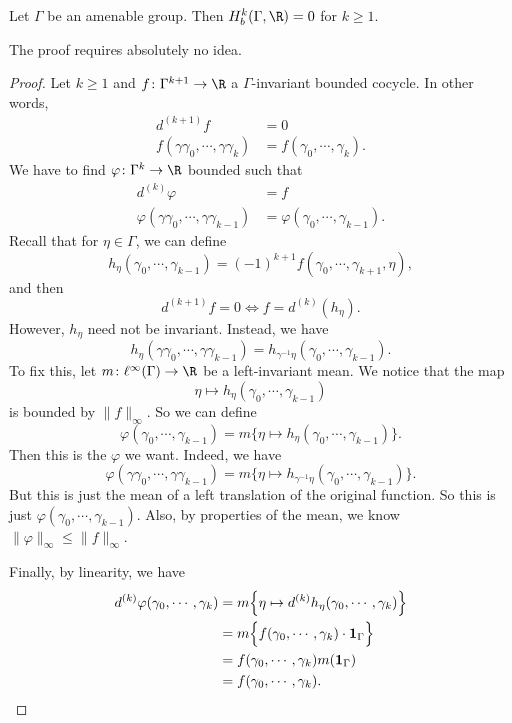\documentclass[a4paper]{article}
\begin{document}
\begin{prop}
  Let $\Gamma$ be an amenable group. Then $H^k_b(\Gamma, \R) = 0$ for $k \geq 1$.
\end{prop}

The proof requires absolutely no idea.
\begin{proof}
  Let $k \geq 1$ and $f\colon \Gamma^{k + 1} \to \R$ a $\Gamma$-invariant bounded cocycle. In other words,
  \begin{align*}
    d^{(k + 1)} f &= 0\\
    f(\gamma\gamma_0, \cdots, \gamma\gamma_k) &= f(\gamma_0, \cdots, \gamma_k).
  \end{align*}
  We have to find $\varphi\colon \Gamma^k \to \R$ bounded such that
  \begin{align*}
    d^{(k)} \varphi &= f\\
    \varphi(\gamma\gamma_0, \cdots, \gamma\gamma_{k - 1}) &= \varphi(\gamma_0, \cdots, \gamma_{k - 1}).
  \end{align*}
  Recall that for $\eta \in \Gamma$, we can define
  \[
    h_\eta (\gamma_0, \cdots, \gamma_{k - 1}) = (-1)^{k + 1} f(\gamma_0, \cdots, \gamma_{k + 1}, \eta),
  \]
  and then
  \[
    d^{(k + 1)}f = 0 \Longleftrightarrow f = d^{(k)}(h_\eta).
  \]
  However, $h_\eta$ need not be invariant. Instead, we have
  \[
    h_\eta(\gamma\gamma_0, \cdots, \gamma\gamma_{k - 1}) = h_{\gamma^{-1} \eta} (\gamma_0, \cdots, \gamma_{k - 1}).
  \]
  To fix this, let $m \colon \ell^\infty(\Gamma) \to \R$ be a left-invariant mean. We notice that the map
  \[
    \eta \mapsto h_\eta (\gamma_0, \cdots, \gamma_{k - 1})
  \]
  is bounded by $\|f\|_\infty$. So we can define
  \[
    \varphi(\gamma_0, \cdots, \gamma_{k - 1}) = m \Big\{ \eta \mapsto h_\eta (\gamma_0, \cdots, \gamma_{k - 1})\Big\}.
  \]
  Then this is the $\varphi$ we want. Indeed, we have
  \[
    \varphi(\gamma \gamma_0, \cdots, \gamma \gamma_{k - 1}) = m \Big\{ \eta \mapsto h_{\gamma^{-1}\eta} (\gamma_0, \cdots, \gamma_{k - 1})\Big\}.
  \]
  But this is just the mean of a left translation of the original function. So this is just $\varphi(\gamma_0, \cdots, \gamma_{k - 1})$. Also, by properties of the mean, we know $\|\varphi\|_\infty \leq \|f\|_\infty$.

  Finally, by linearity, we have
  \begin{align*}
    d^{(k)} \varphi(\gamma_0, \cdots, \gamma_k) &= m \Big\{ \eta \mapsto d^{(k)} h_\eta (\gamma_0, \cdots, \gamma_k) \Big\}\\
    &= m \Big\{ f(\gamma_0, \cdots, \gamma_k) \cdot \mathbf{1}_\Gamma\Big\}\\
    &= f(\gamma_0, \cdots, \gamma_k) m (\mathbf{1}_\Gamma)\\
    &= f(\gamma_0, \cdots, \gamma_k).\qedhere
  \end{align*}
\end{proof}
\end{document}
